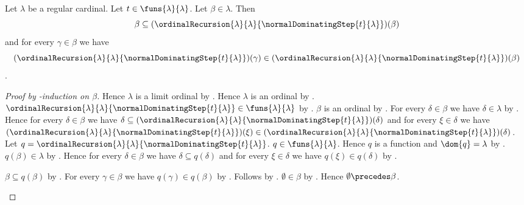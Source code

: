 \begin{theorem}\label{normal_dominating_recursion_growth}
    Let $\lambda$ be a regular cardinal.
    Let $t\in\funs{\lambda}{\lambda}$.
    Let $\beta\in\lambda$.
    Then
    \[
        \beta\subseteq
        (\ordinalRecursion{\lambda}{\lambda}
            {\normalDominatingStep{t}{\lambda}})(\beta)
    \]
    and for every $\gamma\in\beta$ we have
    \[
        (\ordinalRecursion{\lambda}{\lambda}
            {\normalDominatingStep{t}{\lambda}})(\gamma)
        \in
        (\ordinalRecursion{\lambda}{\lambda}
            {\normalDominatingStep{t}{\lambda}})(\beta)
    \].
\end{theorem}
\begin{proof}[Proof by \in-induction on $\beta$]
    Hence $\lambda$ is a limit ordinal by
        .
    Hence $\lambda$ is an ordinal by .
    $\ordinalRecursion{\lambda}{\lambda}
            {\normalDominatingStep{t}{\lambda}}
        \in\funs{\lambda}{\lambda}$ by
        .
    $\beta$ is an ordinal by .
    For every $\delta\in\beta$ we have $\delta\in\lambda$ by
        .
    Hence for every $\delta\in\beta$ we have
        $\delta\subseteq
            (\ordinalRecursion{\lambda}{\lambda}
                {\normalDominatingStep{t}{\lambda}})(\delta)$
        and for every $\xi\in\delta$ we have
            $(\ordinalRecursion{\lambda}{\lambda}
                {\normalDominatingStep{t}{\lambda}})(\xi)
            \in
            (\ordinalRecursion{\lambda}{\lambda}
                {\normalDominatingStep{t}{\lambda}})(\delta)$.
    Let $q=\ordinalRecursion{\lambda}{\lambda}
        {\normalDominatingStep{t}{\lambda}}$.
    $q\in\funs{\lambda}{\lambda}$.
    Hence $q$ is a function and $\dom{q}=\lambda$ by
        .
    $q(\beta)\in\lambda$ by .
    Hence for every $\delta\in\beta$ we have
        $\delta\subseteq q(\delta)$ and for every $\xi\in\delta$ we have
            $q(\xi)\in q(\delta)$ by \auto.
    \begin{byCase}
            $\beta\subseteq q(\beta)$ by .
            For every $\gamma\in\beta$ we have
                $q(\gamma)\in q(\beta)$ by .
            Follows by \auto.
            $\emptyset\in\beta$ by
                .
            Hence $\emptyset\precedes\beta$.

\end{byCase}
\end{proof}
